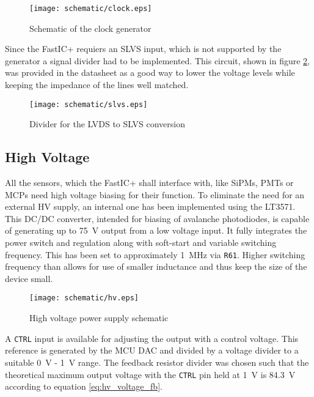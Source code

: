 \FloatBarrier
\begin{figure}[htp!]
    \centering
    \texttt{[image: schematic/clock.eps]}
    \caption{Schematic of the clock generator}
    \label{fig:schem_clock}
\end{figure}
\FloatBarrier

Since the FastIC+ requiers an SLVS input, which is not supported by the generator a signal divider had to be implemented. This circuit, shown in figure \ref{fig:schem_slvs}, was provided in the datasheet as a good way to lower the voltage levels while keeping the impedance of the lines well matched. 
\FloatBarrier
\begin{figure}[htp!]
    \centering
    \texttt{[image: schematic/slvs.eps]}
    \caption{Divider for the LVDS to SLVS conversion}
    \label{fig:schem_slvs}
\end{figure}
\FloatBarrier

\subsection{High Voltage}
All the sensors, which the FastIC+ shall interface with, like SiPMs, PMTs or MCPs need high voltage biasing for their function. To eliminate the need for an external HV supply, an internal one has been implemented using the LT3571. This DC/DC converter, intended for biasing of avalanche photodiodes, is capable of generating up to \SI{75}{\volt} output from a low voltage input. It fully integrates the power switch and regulation along with soft-start and variable switching frequency. This has been set to approximately \SI{1}{\mega\hertz} via \verb|R61|. Higher switching frequency than allows for use of smaller inductance and thus keep the size of the device small. 

\FloatBarrier
\begin{figure}[htp!]
    \centering
    \texttt{[image: schematic/hv.eps]}
    \caption{High voltage power supply schematic}
    \label{fig:schem_hv}
\end{figure}
\FloatBarrier

A \verb|CTRL| input is available for adjusting the output with a control voltage. This reference is generated by the MCU DAC and divided by a voltage divider to a suitable \SI{0}{V} -  \SI{1}{V} range. The feedback resistor divider was chosen such that the theoretical maximum output voltage with the \verb|CTRL| pin held at \SI{1}{\volt} is \SI{84.3}{\volt} according to equation \ref{eq:hv_voltage_fb}.

